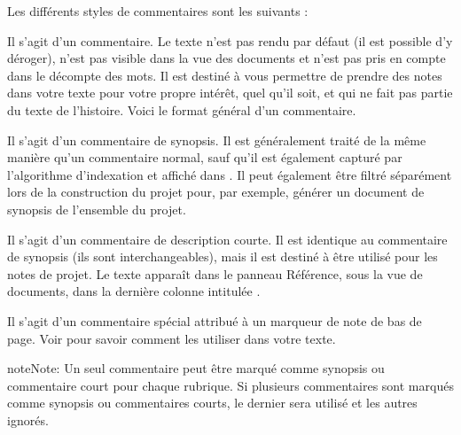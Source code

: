 \documentclass[a4paper,11pt,french]{sphinxmanual}
\begin{document}
\sphinxAtStartPar
Les différents styles de commentaires sont les suivants :
\begin{description}
\sphinxAtStartPar
Il s’agit d’un commentaire. Le texte n’est pas rendu par défaut (il est possible d’y déroger), n’est pas visible dans la vue des documents et n’est pas pris en compte dans le décompte des mots. Il est destiné à vous permettre de prendre des notes dans votre texte pour votre propre intérêt, quel qu’il soit, et qui ne fait pas partie du texte de l’histoire. Voici le format général d’un commentaire.

\sphinxAtStartPar
Il s’agit d’un commentaire de synopsis. Il est généralement traité de la même manière qu’un commentaire normal, sauf qu’il est également capturé par l’algorithme d’indexation et affiché dans {\hyperref[\detokenize{usage_project:a-ui-outline}]{}}. Il peut également être filtré séparément lors de la construction du projet pour, par exemple, générer un document de synopsis de l’ensemble du projet.

\sphinxAtStartPar
Il s’agit d’un commentaire de description courte. Il est identique au commentaire de synopsis (ils sont interchangeables), mais il est destiné à être utilisé pour les notes de projet. Le texte apparaît dans le panneau Référence, sous la vue de documents, dans la dernière colonne intitulée .

\sphinxAtStartPar
Il s’agit d’un commentaire spécial attribué à un marqueur de note de bas de page. Voir {\hyperref[\detokenize{usage_format:a-fmt-footnote}]{}} pour savoir comment les utiliser dans votre texte.

\end{description}

\begin{sphinxadmonition}{note}{Note:}
\sphinxAtStartPar
Un seul commentaire peut être marqué comme synopsis ou commentaire court pour chaque rubrique. Si plusieurs commentaires sont marqués comme synopsis ou commentaires courts, le dernier sera utilisé et les autres ignorés.
\end{sphinxadmonition}
\end{document}
